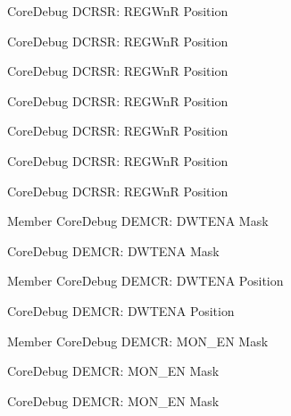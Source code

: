 \begin{DoxyRefList}
\label{deprecated__deprecated000594}%
%
Core\+Debug DCRSR\+: REGWnR Position 

\label{deprecated__deprecated000041}%
%
Core\+Debug DCRSR\+: REGWnR Position 

\label{deprecated__deprecated000327}%
%
Core\+Debug DCRSR\+: REGWnR Position 

\label{deprecated__deprecated000185}%
%
Core\+Debug DCRSR\+: REGWnR Position 

\label{deprecated__deprecated000268}%
%
Core\+Debug DCRSR\+: REGWnR Position 

\label{deprecated__deprecated000403}%
%
Core\+Debug DCRSR\+: REGWnR Position 

\label{deprecated__deprecated000129}%
%
Core\+Debug DCRSR\+: REGWnR Position  
\item[Member \doxylink{group__CMSIS__CoreDebug_ga2fcc0b8f174e85379d38e1cb74b8c627}{Core\+Debug\+\_\+\+DEMCR\+\_\+\+DWTENA\+\_\+\+Msk} ]\label{deprecated__deprecated000134}%
%
Core\+Debug DEMCR\+: DWTENA Mask 

\label{deprecated__deprecated000273}%
%
Core\+Debug DEMCR\+: DWTENA Mask  
\item[Member \doxylink{group__CMSIS__CoreDebug_ga0cde79c4e741e1eed0513c1f985baeb9}{Core\+Debug\+\_\+\+DEMCR\+\_\+\+DWTENA\+\_\+\+Pos} ]\label{deprecated__deprecated000133}%
%
Core\+Debug DEMCR\+: DWTENA Position 

\label{deprecated__deprecated000272}%
%
Core\+Debug DEMCR\+: DWTENA Position  
\item[Member \doxylink{group__CMSIS__CoreDebug_gac2b46b9b65bf8d23027f255fc9641977}{Core\+Debug\+\_\+\+DEMCR\+\_\+\+MON\+\_\+\+EN\+\_\+\+Msk} ]\label{deprecated__deprecated000416}%
%
Core\+Debug DEMCR\+: MON\+\_\+\+EN Mask 

\label{deprecated__deprecated000505}%
%
Core\+Debug DEMCR\+: MON\+\_\+\+EN Mask 

\label{deprecated__deprecated000198}%
%
Core\+Debug DEMCR\+: MON\+\_\+\+EN Mask 


\end{DoxyRefList}
